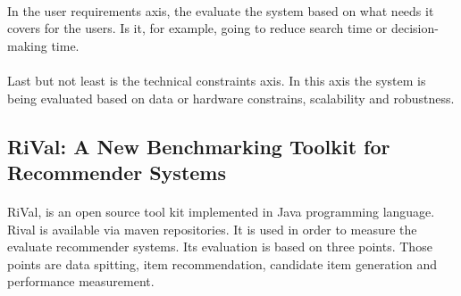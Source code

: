 \paragraph{}In the user requirements axis, the evaluate the system based on what needs it covers for the users. Is it, for example, going to reduce search time or decision-making time.

\paragraph{}Last but not least is the technical constraints axis. In this axis the system is being evaluated based on data or hardware constrains, scalability and robustness.

\subsection{RiVal: A New Benchmarking Toolkit for Recommender Systems \cite{said2014rival}}
\paragraph{}RiVal, is an open source tool kit implemented in Java programming language. Rival is available via maven repositories. It is used in order to measure the evaluate recommender systems. Its evaluation is based on three points. Those points are data spitting, item recommendation, candidate item generation and performance measurement. 
